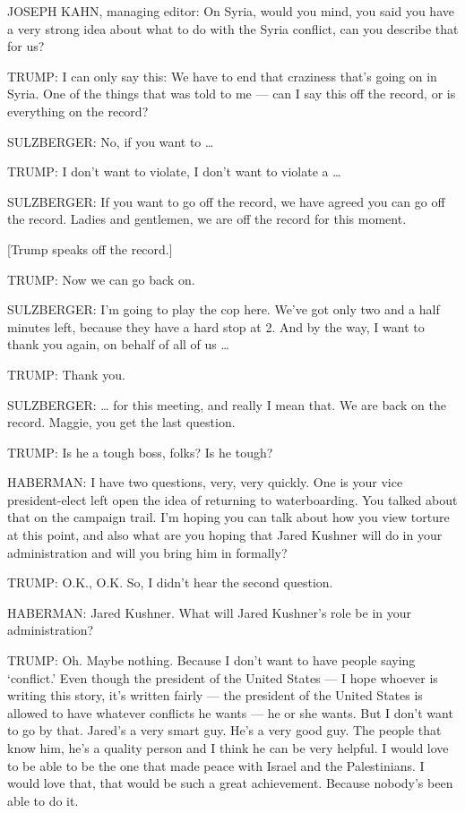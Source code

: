 JOSEPH KAHN, managing editor: On Syria, would you mind, you said you
have a very strong idea about what to do with the Syria conflict, can
you describe that for us?

TRUMP: I can only say this: We have to end that craziness that's going
on in Syria. One of the things that was told to me --- can I say this
off the record, or is everything on the record?

SULZBERGER: No, if you want to \ldots{}

TRUMP: I don't want to violate, I don't want to violate a \ldots{}

SULZBERGER: If you want to go off the record, we have agreed you can go
off the record. Ladies and gentlemen, we are off the record for this
moment.

{[}Trump speaks off the record.{]}

TRUMP: Now we can go back on.

SULZBERGER: I'm going to play the cop here. We've got only two and a
half minutes left, because they have a hard stop at 2. And by the way, I
want to thank you again, on behalf of all of us \ldots{}

TRUMP: Thank you.

SULZBERGER: \ldots{} for this meeting, and really I mean that. We are
back on the record. Maggie, you get the last question.

TRUMP: Is he a tough boss, folks? Is he tough?

HABERMAN: I have two questions, very, very quickly. One is your vice
president-elect left open the idea of returning to waterboarding. You
talked about that on the campaign trail. I'm hoping you can talk about
how you view torture at this point, and also what are you hoping that
Jared Kushner will do in your administration and will you bring him in
formally?

TRUMP: O.K., O.K. So, I didn't hear the second question.

HABERMAN: Jared Kushner. What will Jared Kushner's role be in your
administration?

TRUMP: Oh. Maybe nothing. Because I don't want to have people saying
`conflict.' Even though the president of the United States --- I hope
whoever is writing this story, it's written fairly --- the president of
the United States is allowed to have whatever conflicts he wants --- he
or she wants. But I don't want to go by that. Jared's a very smart guy.
He's a very good guy. The people that know him, he's a quality person
and I think he can be very helpful. I would love to be able to be the
one that made peace with Israel and the Palestinians. I would love that,
that would be such a great achievement. Because nobody's been able to do
it.

